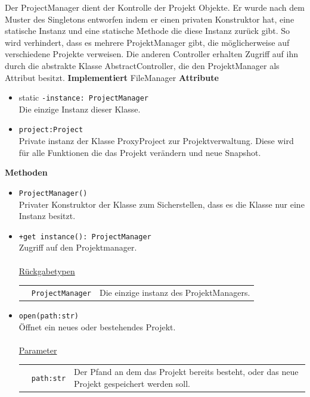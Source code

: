 \documentclass{article}
\begin{document}
\begin{itemize}
Der ProjectManager dient der Kontrolle der Projekt Objekte. Er wurde nach dem Muster des Singletons entworfen indem er einen privaten Konstruktor hat, eine statische Instanz und eine statische Methode die diese Instanz zurück gibt. So wird verhindert, dass es mehrere ProjektManager gibt, die möglicherweise auf verschiedene Projekte verweisen. Die anderen Controller erhalten Zugriff auf ihn durch die abstrakte Klasse AbstractController, die den ProjektManager als Attribut besitzt.
\newline\newline
\textbf{\large{Implementiert}} FileManager 
\newline\newline
\textbf{\large{Attribute}}
\begin{itemize}
\item static \texttt{-instance: ProjectManager}\\ Die einzige Instanz dieser Klasse.
\item \texttt{project:Project}\\Private instanz der Klasse ProxyProject zur Projektverwaltung. Diese wird für alle Funktionen die das Projekt verändern und neue Snapshot. 
\end{itemize}\leavevmode\newline
\textbf{\large{Methoden}}
\begin{itemize}
\item \texttt{ProjectManager()}\\ Privater Konstruktor der Klasse zum Sicherstellen, dass es die Klasse nur eine Instanz besitzt.
\item \texttt{+get instance(): ProjectManager}\\ Zugriff auf den Projektmanager.\\\\
\underline{{Rückgabetypen}}\\
\begin{tabular}{llp{8.5cm}}
 & \texttt{ProjectManager} & Die einzige instanz des ProjektManagers. \\
\end{tabular}
\item \texttt{open(path:str)}\\ Öffnet ein neues oder bestehendes Projekt.\\\\
\underline{{Parameter}}\\
\begin{tabular}{llp{8.5cm}}
 & \texttt{path:str} & Der Pfand an dem das Projekt bereits besteht, oder das neue Projekt gespeichert werden soll. \\
\end{tabular}


\end{itemize}
\end{itemize}
\end{document}
